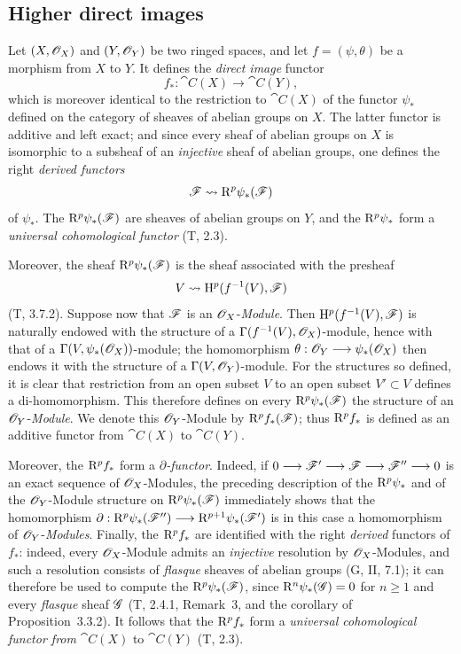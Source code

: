 \subsection{Higher direct images}
\label{subsection:0.12.2}

\begin{env}[12.2.1]
\label{0.12.2.1}
Let $(X,\mathscr{O}_X)$ and $(Y,\mathscr{O}_Y)$ be two ringed spaces, and let
$f=(\psi,\theta)$ be a morphism from $X$ to $Y$.  It defines the \emph{direct
image} functor
\[
  f_*:\cat{C}(X)\longrightarrow\cat{C}(Y),
\]
which is moreover identical to the restriction to $\cat{C}(X)$ of the
functor $\psi_*$ defined on the category of sheaves of abelian groups
on $X$.
The latter functor is additive and left exact; and since every sheaf of
abelian groups on $X$ is isomorphic to a subsheaf of an \emph{injective} sheaf
of abelian groups, one defines the right \emph{derived functors}
\[
  \mathscr{F}\leadsto\mathrm{R}^p\psi_*(\mathscr{F})
\]
of $\psi_*$.  The $\mathrm{R}^p\psi_*(\mathscr{F})$ are sheaves of abelian groups
on $Y$, and the $\mathrm{R}^p\psi_*$ form a \emph{universal cohomological functor}
(T, 2.3).

Moreover, the sheaf $\mathrm{R}^p\psi_*(\mathscr{F})$ is the sheaf associated with the
presheaf
\[
  V\leadsto\mathrm{H}^p(f^{-1}(V),\mathscr{F})
\]
(T, 3.7.2).
Suppose now that $\mathscr{F}$ is an $\mathscr{O}_X$-\emph{Module}.
Then $\mathrm{H}^p(f^{-1}(V),\mathscr{F})$ is naturally endowed with the structure
of a $\Gamma(f^{-1}(V),\mathscr{O}_X)$-module, hence with that of a
$\Gamma(V,\psi_*(\mathscr{O}_X))$-module; the homomorphism $\theta:\mathscr{O}_Y\longrightarrow\psi_*(\mathscr{O}_X)$
then endows it with the structure of a
$\Gamma(V,\mathscr{O}_Y)$-module.
For the structures so defined, it is clear that restriction from an open subset $V$ to
an open subset $V'\subset V$ defines a di-homomorphism.  This therefore
defines on every $\mathrm{R}^p\psi_*(\mathscr{F})$ the structure of an
$\mathscr{O}_Y$-\emph{Module}.  We denote this $\mathscr{O}_Y$-Module by
$\mathrm{R}^p f_*(\mathscr{F})$; thus $\mathrm{R}^p f_*$ is defined as an additive
functor from $\cat{C}(X)$ to $\cat{C}(Y)$.

Moreover, the $\mathrm{R}^p f_*$ form a \emph{$\partial$-functor}.  Indeed, if $0\longrightarrow\mathscr{F}'\longrightarrow\mathscr{F}
\longrightarrow\mathscr{F}''\longrightarrow0$
is an exact sequence of $\mathscr{O}_X$-Modules, the preceding description
of the $\mathrm{R}^p\psi_*$ and of the $\mathscr{O}_Y$-Module structure on
$\mathrm{R}^p\psi_*(\mathscr{F})$ immediately shows that the homomorphism $\partial:\mathrm{R}^p\psi_*(\mathscr{F}'')
\longrightarrow\mathrm{R}^{p+1}\psi_*(\mathscr{F}')$
is in this case a homomorphism of $\mathscr{O}_Y$-\emph{Modules}.
Finally, the $\mathrm{R}^p f_*$ are identified with the right \emph{derived} functors
of $f_*$: indeed, every $\mathscr{O}_X$-Module admits an \emph{injective} resolution by
$\mathscr{O}_X$-Modules, and such a resolution consists of \emph{flasque} sheaves
of abelian groups (G, II, 7.1); it can therefore be used to compute the
$\mathrm{R}^p\psi_*(\mathscr{F})$, since $\mathrm{R}^n\psi_*(\mathscr{G})=0$ for $n\geq1$
and every \emph{flasque} sheaf $\mathscr{G}$ (T, 2.4.1, Remark~3, and the
corollary of Proposition~3.3.2).
It follows that the $\mathrm{R}^p f_*$ form a \emph{universal cohomological functor
from} $\cat{C}(X)$ to $\cat{C}(Y)$ (T, 2.3).
\end{env}

